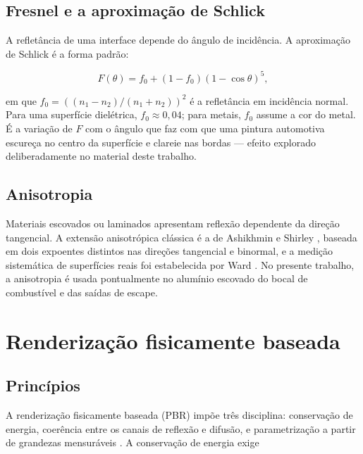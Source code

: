\subsection{Fresnel e a aproxima\c{c}\~ao de Schlick}

A reflet\^ancia de uma interface depende do \^angulo de incid\^encia. A aproxima\c{c}\~ao de
Schlick \cite{schlick1994} \'e a forma padr\~ao:

\begin{equation}
F(\theta) = f_0 + (1 - f_0)\left(1 - \cos\theta\right)^5 ,
\label{eq:schlick}
\end{equation}

\noindent em que $f_0 = ((n_1-n_2)/(n_1+n_2))^2$ \'e a reflet\^ancia em incid\^encia normal.
Para uma superf\'icie diel\'etrica, $f_0 \approx 0,04$; para metais, $f_0$ assume a cor do metal.
\'E a varia\c{c}\~ao de $F$ com o \^angulo que faz com que uma pintura automotiva escure\c{c}a no
centro da superf\'icie e clareie nas bordas --- efeito explorado deliberadamente no material
deste trabalho.

\subsection{Anisotropia}

Materiais escovados ou laminados apresentam reflex\~ao dependente da dire\c{c}\~ao tangencial.
A extens\~ao anisotr\'opica cl\'assica \'e a de Ashikhmin e Shirley \cite{ashikhmin2000},
baseada em dois expoentes distintos nas dire\c{c}\~oes tangencial e binormal, e a medi\c{c}\~ao
sistem\'atica de superf\'icies reais foi estabelecida por Ward \cite{ward1992}. No presente
trabalho, a anisotropia \'e usada pontualmente no alum\'inio escovado do bocal de combust\'ivel
e das sa\'idas de escape.

\section{Renderiza\c{c}\~ao fisicamente baseada}

\subsection{Princ\'ipios}

A renderiza\c{c}\~ao fisicamente baseada (PBR) imp\~oe tr\^es disciplina: conserva\c{c}\~ao de
energia, coer\^encia entre os canais de reflex\~ao e difus\~ao, e parametriza\c{c}\~ao a partir de
grandezas mensur\'aveis \cite{burley2012}. A conserva\c{c}\~ao de energia exige

